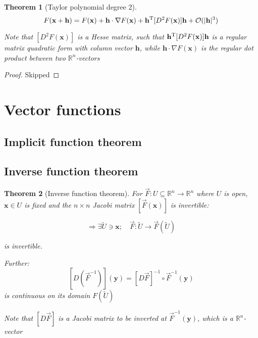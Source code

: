 \documentclass{article}
\theoremstyle{plain}
\newtheorem{theorem}{Theorem}
\begin{document}
\begin{theorem}[Taylor polynomial degree 2]
    \label{th:taylor}
    \begin{equation}\label{eq:taylor}
        F(\mathbf x + \mathbf h) = F(\mathbf x) + \mathbf h \cdot \nabla F(\mathbf x) + \mathbf h^{\rm{T}} [D^2 F(\mathbf x)] \mathbf h + \mathcal O (|\mathbf h|^3)
    \end{equation}

    Note that $[D^2 F(\mathbf x)]$ is a Hesse matrix, such that $\mathbf h^{\rm{T}} [D^2 F(\mathbf x)] \mathbf h$ is a regular matrix quadratic
    form with column vector $\mathbf h$, while $\mathbf h \cdot \nabla F(\mathbf x)$ is the regular dot product between two $\mathbb R^n$-vectors
\end{theorem}

\begin{proof}
    Skipped
\end{proof}
\section{Vector functions}

\subsection{Implicit function theorem}



\subsection{Inverse function theorem}

\begin{theorem}[Inverse function theorem]
    For $\vec F: U \subseteq \mathbb R^n \rightarrow \mathbb R^n$
    where $U$ is open, $\mathbf x \in U$ is fixed and the
    $n \times n$ Jacobi matrix $[ \vec F(\mathbf x)]$ is invertible:

    $$\Rightarrow \exists \tilde{U} \ni \mathbf x; \quad \vec F: \tilde U \rightarrow \vec F(\tilde U)$$

    is invertible.

    Further:
    $$[D (\vec F^{-1})](\mathbf y) = [D \vec F]^{-1} \circ \vec F^{-1}(\mathbf y)$$
    is continuous on its domain $F(\tilde U)$

    Note that $[D \vec F]$ is a Jacobi matrix to be inverted at $ \vec F^{-1}(\mathbf y)$, which
    is a $\mathbb R^n$-vector
    
\end{theorem}
\end{document}
